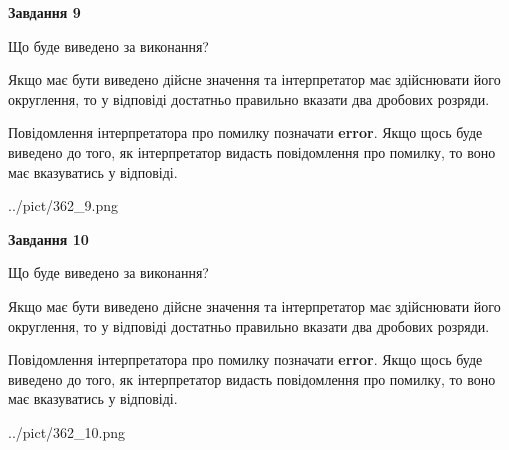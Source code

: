 \documentclass[12pt, ukrainian]{article}
\begin{document}
{\begin {Large}
{\begin {center}\textbf{Завдання 9}\end {center}}\par
Що буде виведено за виконання? \par

Якщо має бути виведено дійсне значення та інтерпретатор має здійснювати його округлення, 
то у відповіді достатньо правильно вказати два дробових розряди.

Повідомлення інтерпретатора про помилку позначати \textbf{error}.
Якщо щось буде виведено до того, як інтерпретатор видасть повідомлення про помилку, 
то воно має вказуватись у відповіді. \par

\begin{center}
	{../pict/362_9.png}
\end{center}
\newpage

{\begin {center}\textbf{Завдання 10}\end {center}}\par
Що буде виведено за виконання? \par

Якщо має бути виведено дійсне значення та інтерпретатор має здійснювати його округлення, 
то у відповіді достатньо правильно вказати два дробових розряди.

Повідомлення інтерпретатора про помилку позначати \textbf{error}.
Якщо щось буде виведено до того, як інтерпретатор видасть повідомлення про помилку, 
то воно має вказуватись у відповіді. \par

\begin{center}
	{../pict/362_10.png}
\end{center}
\newpage

\end {Large}}
\end{document}
